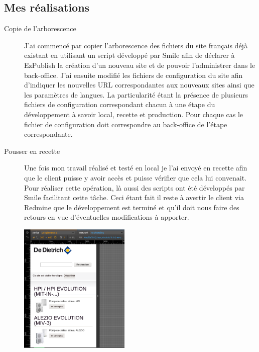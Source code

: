 \documentclass[a4paper,11pt,twoside]{report}
\begin{document}
    \subsection*{Mes réalisations}
      \begin{description}

	\item[Copie de l'arborescence] J'ai commencé par copier l'arborescence des fichiers du site français déjà existant en utilisant un script développé par Smile afin de déclarer à EzPublish la création d'un nouveau site et de pouvoir l'administrer dans le back-office. J'ai ensuite modifié les fichiers de configuration du site afin d'indiquer les nouvelles URL correspondantes aux nouveaux sites ainsi que les paramètres de langues. La particularité étant la présence de plusieurs fichiers de configuration correspondant chacun à une étape du développement à savoir local, recette et production. Pour chaque cas le fichier de configuration doit correspondre au back-office de l'étape correspondante.  
	\item[Pousser en recette] Une fois mon travail réalisé et testé en local je l'ai envoyé en recette afin que le client puisse y avoir accès et puisse vérifier que cela lui convenait. Pour réaliser cette opération, là aussi des scripts ont été développés par Smile facilitant cette tâche. Ceci étant fait il reste à avertir le client via Redmine que le développement est terminé et qu'il doit nous faire des retours en vue d'éventuelles modifications à apporter.
	\begin{center}
	  \includegraphics[width=200]{images/DDTH_home_be_fr.png} 

\end{center}
\end{description}
\end{document}
